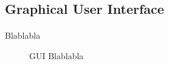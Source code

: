 \subsection{Graphical User Interface}

\paragraph{}Blablabla

\begin{figure}[h!]
\centering
\caption{GUI Blablabla}
\end{figure}
